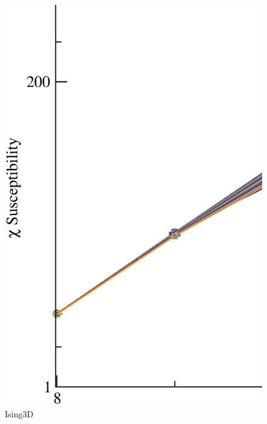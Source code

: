 \begin{figure}[!htpb]
  \centering
  \includegraphics[width=15cm]{./plots/Ising3D/Ising3D_Susceptibility_vs_L.eps}
  \caption{Ising3D}
\end{figure}

